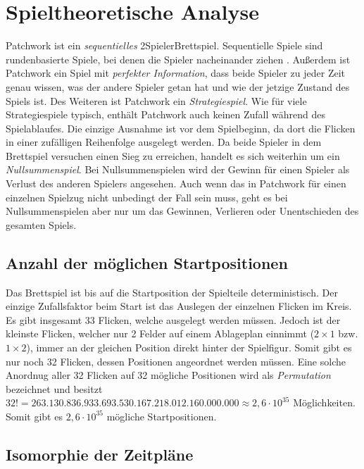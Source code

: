 \section{Spieltheoretische Analyse}

Patchwork ist ein \emph{sequentielles} 2\textendash{}Spieler\textendash{}Brettspiel. Sequentielle Spiele sind rundenbasierte Spiele, bei denen die Spieler nacheinander ziehen \cite[S. 53]{2014.GameTheoryThroughExamples}. Außerdem ist Patchwork ein Spiel mit \emph{perfekter Information}, \dash dass beide Spieler zu jeder Zeit genau wissen, was der andere Spieler getan hat und wie der jetzige Zustand des Spiels ist. Des Weiteren ist Patchwork ein \emph{Strategiespiel}. Wie für viele Strategiespiele typisch, enthält Patchwork auch keinen Zufall während des Spielablaufes. Die einzige Ausnahme ist vor dem Spielbeginn, da dort die Flicken in einer zufälligen Reihenfolge ausgelegt werden. Da beide Spieler in dem Brettspiel versuchen einen Sieg zu erreichen, handelt es sich weiterhin um ein \emph{Nullsummenspiel}. Bei Nullsummenspielen wird der Gewinn für einen Spieler als Verlust des anderen Spielers angesehen. Auch wenn das in Patchwork für einen einzelnen Spielzug nicht unbedingt der Fall sein muss, geht es bei Nullsummenspielen aber nur um das Gewinnen, Verlieren oder Unentschieden des gesamten Spiels.

\subsection*{Anzahl der möglichen Startpositionen}

Das Brettspiel ist bis auf die Startposition der Spielteile deterministisch. Der einzige Zufallsfaktor beim Start ist das Auslegen der einzelnen Flicken im Kreis. Es gibt insgesamt 33 Flicken, welche ausgelegt werden müssen. Jedoch ist der kleinste Flicken, welcher nur 2 Felder auf einem Ablageplan einnimmt ($2\times1$ bzw. $1\times2$), immer an der gleichen Position direkt hinter der Spielfigur. Somit gibt es nur noch 32 Flicken, dessen Positionen angeordnet werden müssen. Eine solche Anordnug aller 32 Flicken auf 32 mögliche Positionen wird als \emph{Permutation} bezeichnet und besitzt $32! = 263.130.836.933.693.530.167.218.012.160.000.000 \approx 2,6 \cdot 10^{35}$ Möglichkeiten. Somit gibt es $2,6 \cdot 10^{35}$ mögliche Startpositionen.

\subsection*{Isomorphie der Zeitpläne}


